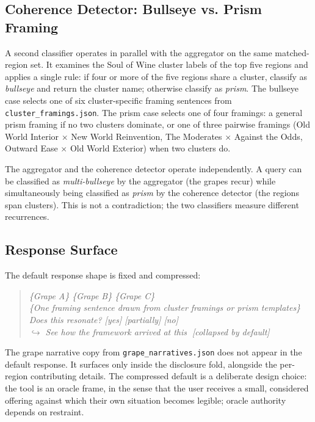 \documentclass[11pt]{article}
\begin{document}
\subsection{Coherence Detector: Bullseye vs. Prism Framing}
A second classifier operates in parallel with the aggregator on the same matched-region set. It examines the Soul of Wine cluster labels of the top five regions and applies a single rule: if four or more of the five regions share a cluster, classify as \emph{bullseye} and return the cluster name; otherwise classify as \emph{prism}. The bullseye case selects one of six cluster-specific framing sentences from \texttt{cluster\_framings.json}. The prism case selects one of four framings: a general prism framing if no two clusters dominate, or one of three pairwise framings (Old World Interior $\times$ New World Reinvention, The Moderates $\times$ Against the Odds, Outward Ease $\times$ Old World Exterior) when two clusters do.

The aggregator and the coherence detector operate independently. A query can be classified as \emph{multi-bullseye} by the aggregator (the grapes recur) while simultaneously being classified as \emph{prism} by the coherence detector (the regions span clusters). This is not a contradiction; the two classifiers measure different recurrences.

\subsection{Response Surface}
The default response shape is fixed and compressed:

\begin{quote}
\itshape
\{Grape A\} \textperiodcentered{} \{Grape B\} \textperiodcentered{} \{Grape C\}\\[2pt]
\{One framing sentence drawn from cluster framings or prism templates\}\\[2pt]
Does this resonate? [yes] [partially] [no]\\[2pt]
$\hookrightarrow$ See how the framework arrived at this $\;$[collapsed by default]
\end{quote}

The grape narrative copy from \texttt{grape\_narratives.json} does not appear in the default response. It surfaces only inside the disclosure fold, alongside the per-region contributing details. The compressed default is a deliberate design choice: the tool is an oracle frame, in the sense that the user receives a small, considered offering against which their own situation becomes legible; oracle authority depends on restraint.
\end{document}
